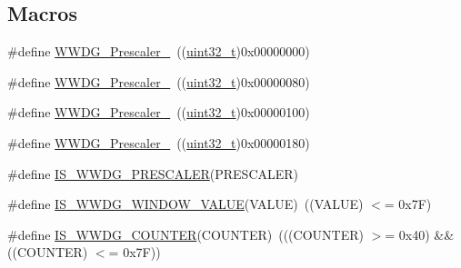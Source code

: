 \subsection*{Macros}
\begin{DoxyCompactItemize}
\item 
\#define \hyperlink{group___w_w_d_g___prescaler_ga55780dcf60a252724f5aae2ca37d91c5}{W\+W\+D\+G\+\_\+\+Prescaler\+\_}~((\hyperlink{_p_e___types_8h_a33594304e786b158f3fb30289278f5af}{uint32\+\_\+t})0x00000000)
\item 
\#define \hyperlink{group___w_w_d_g___prescaler_ga2ac67d0a7f8691b5ebf0d7d77d6b5f08}{W\+W\+D\+G\+\_\+\+Prescaler\+\_}~((\hyperlink{_p_e___types_8h_a33594304e786b158f3fb30289278f5af}{uint32\+\_\+t})0x00000080)
\item 
\#define \hyperlink{group___w_w_d_g___prescaler_gab11714e1816967802a8421587e54a2eb}{W\+W\+D\+G\+\_\+\+Prescaler\+\_}~((\hyperlink{_p_e___types_8h_a33594304e786b158f3fb30289278f5af}{uint32\+\_\+t})0x00000100)
\item 
\#define \hyperlink{group___w_w_d_g___prescaler_ga7a4933366603869726bd5ea547d99f02}{W\+W\+D\+G\+\_\+\+Prescaler\+\_}~((\hyperlink{_p_e___types_8h_a33594304e786b158f3fb30289278f5af}{uint32\+\_\+t})0x00000180)
\item 
\#define \hyperlink{group___w_w_d_g___prescaler_ga39070de0722a70f99a6fcfe8720b2dfd}{I\+S\+\_\+\+W\+W\+D\+G\+\_\+\+P\+R\+E\+S\+C\+A\+L\+ER}(P\+R\+E\+S\+C\+A\+L\+ER)
\item 
\#define \hyperlink{group___w_w_d_g___prescaler_gab6ea714a2380b7d6547ba97363887868}{I\+S\+\_\+\+W\+W\+D\+G\+\_\+\+W\+I\+N\+D\+O\+W\+\_\+\+V\+A\+L\+UE}(V\+A\+L\+UE)~((V\+A\+L\+UE) $<$= 0x7\+F)
\item 
\#define \hyperlink{group___w_w_d_g___prescaler_ga4728877128cd60494692d8f14389112e}{I\+S\+\_\+\+W\+W\+D\+G\+\_\+\+C\+O\+U\+N\+T\+ER}(C\+O\+U\+N\+T\+ER)~(((C\+O\+U\+N\+T\+ER) $>$= 0x40) \&\& ((\+C\+O\+U\+N\+T\+E\+R) $<$= 0x7\+F))
\end{DoxyCompactItemize}
